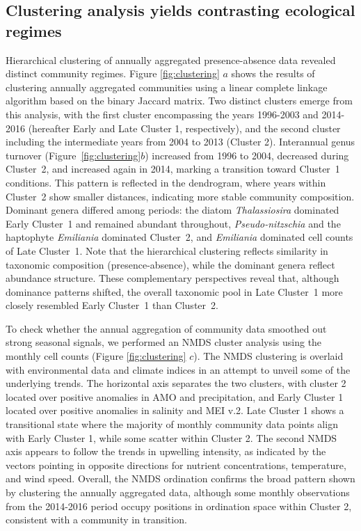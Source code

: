 \documentclass[]{agujournal2019}
\begin{document}
\subsection{Clustering analysis yields contrasting ecological regimes}
    Hierarchical clustering of annually aggregated presence-absence data revealed distinct community regimes. Figure \ref{fig:clustering} $a$ shows the results of clustering annually aggregated communities using a linear complete linkage algorithm based on the binary Jaccard matrix. Two distinct clusters emerge from this analysis, with the first cluster encompassing the years 1996-2003 and 2014-2016 (hereafter Early and Late Cluster 1, respectively), and the second cluster including the intermediate years from 2004 to 2013 (Cluster 2).
    Interannual genus turnover (Figure~\ref{fig:clustering}$b$) increased from 1996 to 2004, decreased during Cluster~2, and increased again in 2014, marking a transition toward Cluster~1 conditions. This pattern is reflected in the dendrogram, where years within Cluster~2 show smaller distances, indicating more stable community composition.
    Dominant genera differed among periods: the diatom \textit{Thalassiosira} dominated Early Cluster~1 and remained abundant throughout, \textit{Pseudo-nitzschia} and the haptophyte \textit{Emiliania} dominated Cluster~2, and \textit{Emiliania} dominated cell counts of Late Cluster~1.
     Note that the hierarchical clustering reflects similarity in taxonomic composition (presence-absence), while the dominant genera reflect abundance structure. These complementary perspectives reveal that, although dominance patterns shifted, the overall taxonomic pool in Late Cluster~1 more closely resembled Early Cluster~1 than Cluster~2.
    
    To check whether the annual aggregation of community data smoothed out strong seasonal signals, we performed an NMDS cluster analysis using the monthly cell counts (Figure \ref{fig:clustering} $c$). The NMDS clustering is overlaid with environmental data and climate indices in an attempt to unveil some of the underlying trends. The horizontal axis separates the two clusters, with cluster 2 located over positive anomalies in AMO and precipitation, and Early Cluster 1 located over positive anomalies in salinity and MEI v.2. Late Cluster 1 shows a transitional state where the majority of monthly community data points align with Early Cluster 1, while some scatter within Cluster 2. The second NMDS axis appears to follow the trends in upwelling intensity, as indicated by the vectors pointing in opposite directions for nutrient concentrations, temperature, and wind speed. Overall, the NMDS ordination confirms the broad pattern shown by clustering the annually aggregated data, although some monthly observations from the 2014-2016 period occupy positions in ordination space within Cluster 2, consistent with a community in transition.
    
\end{document}
